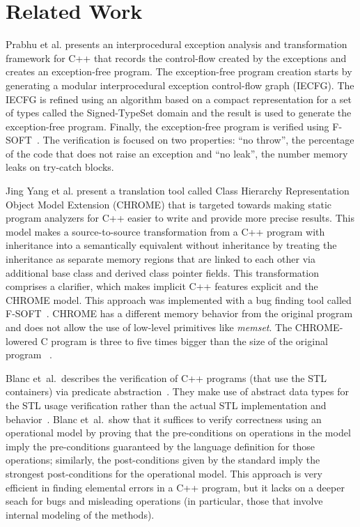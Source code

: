 \documentclass[a4paper]{llncs}
\begin{document}
\section{Related Work}

Prabhu et al. presents an interprocedural exception 
analysis and transformation framework for C++ that 
records the control-flow created by the exceptions 
and creates an exception-free program. The exception-free 
program creation starts by generating a modular interprocedural 
exception control-flow graph (IECFG). The IECFG is refined using 
an algorithm based on a compact representation for a set of types 
called the Signed-TypeSet domain and the result is used 
to generate the exception-free program. Finally, the exception-free 
program is verified using F-SOFT~\cite{Fsoft}. The verification is 
focused on two properties: ``no throw'', the percentage of the code 
that does not raise an exception and ``no leak'', the number memory 
leaks on try-catch blocks.~\cite{PrabhuMBIG11}

Jing Yang et al. present a translation tool called Class Hierarchy 
Representation Object Model Extension (CHROME) that is targeted towards 
making static program analyzers for C++ easier to write and provide 
more precise results. This model makes a source-to-source transformation 
from a C++ program with inheritance into a semantically equivalent without 
inheritance by treating the inheritance as separate memory regions 
that are linked to each other via additional base class and derived class 
pointer fields. This transformation comprises a clarifier, which makes 
implicit C++ features explicit and the CHROME model. This approach was 
implemented with a bug finding tool called F-SOFT~\cite{Fsoft}. CHROME has a 
different memory behavior from the original program and does not allow the use 
of low-level primitives like \textit{memset}. The CHROME-lowered C program is 
three to five times bigger than the size of the original program ~\cite{Yang12}.

Blanc et~al.\ describes the verification of C++ programs (that use the STL containers)
via predicate abstraction~\cite{Blanc07}. They make use of abstract data types for the STL 
usage verification rather than the actual STL implementation and behavior~\cite{Blanc07}. 
Blanc et~al.\ show that it suffices to verify correctness using an operational model 
by proving that the pre-conditions on operations in the model imply the pre-conditions 
guaranteed by the language definition for those operations; similarly, the post-conditions 
given by the standard imply the strongest post-conditions for the operational model. 
This approach is very efficient in finding elemental errors in a C++ program, but it lacks 
on a deeper seach for bugs and misleading operations (in particular, those that involve internal 
modeling of the methods).
\end{document}

